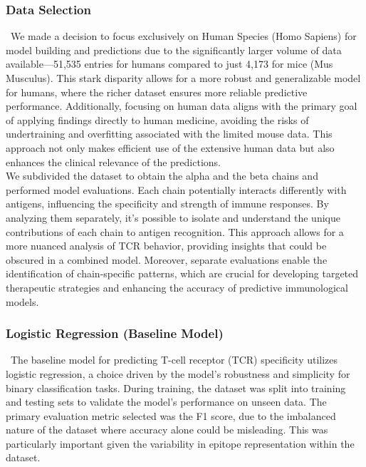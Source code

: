 \documentclass[conference]{IEEEtran}
\begin{document}
    \subsubsection{Data Selection} \
    We made a decision to focus exclusively on Human Species (Homo Sapiens) for model building and predictions due to the significantly larger volume of data available—51,535 entries for humans compared to just 4,173 for mice (Mus Musculus). This stark disparity allows for a more robust and generalizable model for humans, where the richer dataset ensures more reliable predictive performance. Additionally, focusing on human data aligns with the primary goal of applying findings directly to human medicine, avoiding the risks of undertraining and overfitting associated with the limited mouse data. This approach not only makes efficient use of the extensive human data but also enhances the clinical relevance of the predictions. 
    \\
    
    We subdivided the dataset to obtain the alpha and the beta chains and performed model evaluations. Each chain potentially interacts differently with antigens, influencing the specificity and strength of immune responses. By analyzing them separately, it's possible to isolate and understand the unique contributions of each chain to antigen recognition. This approach allows for a more nuanced analysis of TCR behavior, providing insights that could be obscured in a combined model. Moreover, separate evaluations enable the identification of chain-specific patterns, which are crucial for developing targeted therapeutic strategies and enhancing the accuracy of predictive immunological models.
    \\

    \subsubsection{Logistic Regression (Baseline Model)} \
    The baseline model for predicting T-cell receptor (TCR) specificity utilizes logistic regression, a choice driven by the model's robustness and simplicity for binary classification tasks. During training, the dataset was split into training and testing sets to validate the model's performance on unseen data. The primary evaluation metric selected was the F1 score, due to the imbalanced nature of the dataset where accuracy alone could be misleading. This was particularly important given the variability in epitope representation within the dataset.
    \\
\end{document}
